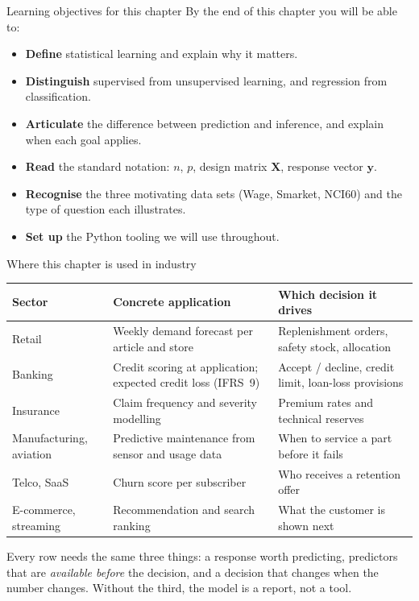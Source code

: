 \documentclass[aspectratio=169,11pt]{beamer}
\begin{document}
\begin{frame}{Learning objectives for this chapter}
  By the end of this chapter you will be able to:
  \begin{itemize}
    \item \textbf{Define} statistical learning and explain why it
          matters.
    \item \textbf{Distinguish} supervised from unsupervised learning,
          and regression from classification.
    \item \textbf{Articulate} the difference between prediction and
          inference, and explain when each goal applies.
    \item \textbf{Read} the standard notation: $n$, $p$, design
          matrix $\mathbf{X}$, response vector $\mathbf{y}$.
    \item \textbf{Recognise} the three motivating data sets (Wage,
          Smarket, NCI60) and the type of question each illustrates.
    \item \textbf{Set up} the Python tooling we will use throughout.
  \end{itemize}
\end{frame}


\begin{frame}{Where this chapter is used in industry}
  \scriptsize
  \begin{center}
  \begin{tabular}{@{}p{2.2cm}p{6.0cm}p{5.0cm}@{}}
    \toprule
    \textbf{Sector} & \textbf{Concrete application} & \textbf{Which decision it drives} \\
    \midrule
    Retail & Weekly demand forecast per article and store & Replenishment orders, safety stock, allocation \\
    Banking & Credit scoring at application; expected credit loss (IFRS~9) & Accept / decline, credit limit, loan-loss provisions \\
    Insurance & Claim frequency and severity modelling & Premium rates and technical reserves \\
    Manufacturing, aviation & Predictive maintenance from sensor and usage data & When to service a part before it fails \\
    Telco, SaaS & Churn score per subscriber & Who receives a retention offer \\
    E-commerce, streaming & Recommendation and search ranking & What the customer is shown next \\
    \bottomrule
  \end{tabular}
  \end{center}
  \begin{industry}
    Every row needs the same three things: a response worth predicting, predictors that are
    \emph{available before} the decision, and a decision that changes when the number changes.
    Without the third, the model is a report, not a tool.
  \end{industry}
\end{frame}
\end{document}
